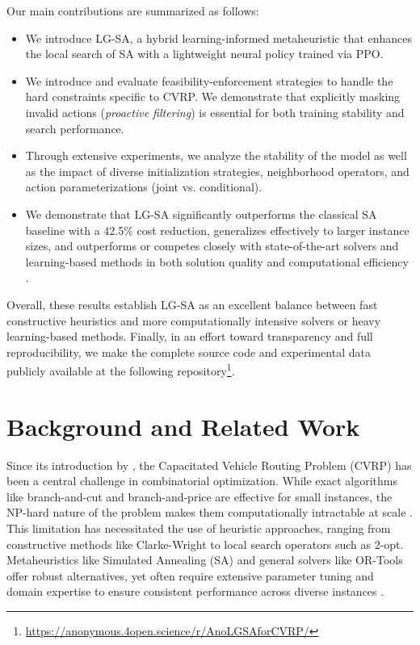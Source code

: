 \documentclass[letterpaper]{article} %
\begin{document}
Our main contributions are summarized as follows:
\begin{itemize}
\item We introduce LG-SA, a hybrid learning-informed metaheuristic that enhances the local search of SA with a lightweight neural policy trained via PPO. 
\item We introduce and evaluate feasibility-enforcement strategies to handle the hard constraints specific to CVRP. We demonstrate that explicitly masking invalid actions (\textit{proactive filtering}) is essential for both training stability and search performance.
\item Through extensive experiments, we analyze the stability of the model as well as the impact of diverse initialization strategies, neighborhood operators, and action parameterizations (joint vs. conditional).
\item We demonstrate that LG-SA significantly outperforms the classical SA baseline with a 42.5\% cost reduction, generalizes effectively to larger instance sizes, and outperforms or competes closely with state-of-the-art solvers and learning-based methods in both solution quality and computational efficiency \citep{ortools_routing, kool_attention_2019, nazari_reinforcement_2018}.
\end{itemize}
Overall, these results establish LG-SA as an excellent balance between fast constructive heuristics and more computationally intensive solvers or heavy learning-based methods. Finally, in an effort toward transparency and full reproducibility, we make the complete source code and experimental data publicly available at the following repository\footnote{\url{https://anonymous.4open.science/r/AnoLGSAforCVRP/}}.

\section{Background and Related Work}

Since its introduction by \citet{dantzig_truck_1959}, the Capacitated Vehicle Routing Problem (CVRP) has been a central challenge in combinatorial optimization. While exact algorithms like branch-and-cut and branch-and-price are effective for small instances, the NP-hard nature of the problem makes them computationally intractable at scale \citep{toth_vehicle_2002}. This limitation has necessitated the use of heuristic approaches, ranging from constructive methods like Clarke-Wright \citep{clarke_scheduling_1964} to local search operators such as 2-opt. Metaheuristics like Simulated Annealing (SA) \citep{kirkpatrick_optimization_1983} and general solvers like OR-Tools \citep{ortools_routing} offer robust alternatives, yet often require extensive parameter tuning and domain expertise to ensure consistent performance across diverse instances \citep{liu_heuristics_2023, muriyatmoko_heuristics_2024}.
\end{document}
